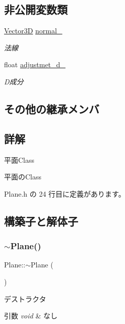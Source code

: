 \subsection*{非公開変数類}
\begin{DoxyCompactItemize}
\item 
\mbox{\hyperlink{class_vector3_d}{Vector3D}} \mbox{\hyperlink{class_plane_a7ae74465500dfdd7a68fa2eb28486ae0}{normal\+\_\+}}
\begin{DoxyCompactList}\small\item\em 法線 \end{DoxyCompactList}\item 
float \mbox{\hyperlink{class_plane_ab43e3263bd879ea710936d85cacb6006}{adjustmet\+\_\+d\+\_\+}}
\begin{DoxyCompactList}\small\item\em D成分 \end{DoxyCompactList}\end{DoxyCompactItemize}
\subsection*{その他の継承メンバ}


\subsection{詳解}
平面\+Class 

平面の\+Class 

 Plane.\+h の 24 行目に定義があります。



\subsection{構築子と解体子}
\mbox{\label{class_plane_a69abd86051c880dcb44b249ad10c4436}} 
\subsubsection{\texorpdfstring{$\sim$\+Plane()}{~Plane()}}
{\footnotesize\ttfamily Plane\+::$\sim$\+Plane (\begin{DoxyParamCaption}{ }\end{DoxyParamCaption})}



デストラクタ 


\begin{DoxyParams}{引数}
{\em void} & なし \\
\hline
\end{DoxyParams}


